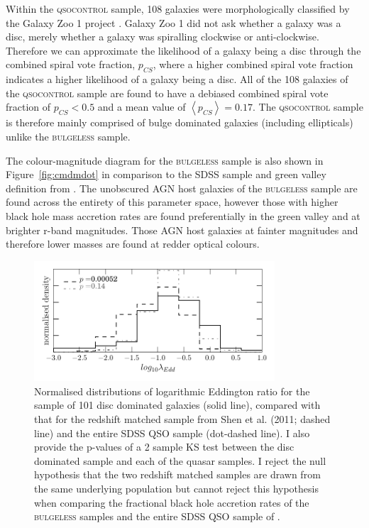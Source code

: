{Within the \textsc{qsocontrol} sample, 108 galaxies were morphologically classified by the Galaxy Zoo 1 project \cite{lintott08, Lintott11}. Galaxy Zoo 1 did not ask whether a galaxy was a disc, merely whether a galaxy was spiralling clockwise or anti-clockwise. Therefore we can approximate the likelihood of a galaxy being a disc through the combined spiral vote fraction, $p_{CS}$, where a higher combined spiral vote fraction indicates a higher likelihood of a galaxy being a disc. All of the 108 galaxies of the \textsc{qsocontrol} sample are found to have a debiased combined spiral vote fraction  of $p_{CS} < 0.5$ and a mean value of $\left<p_{CS} \right> = 0.17$.  The \textsc{qsocontrol} sample is therefore mainly comprised of bulge dominated galaxies (including ellipticals) unlike the \textsc{bulgeless} sample. %

The colour-magnitude diagram for the \textsc{bulgeless} sample is also shown in Figure~\ref{fig:cmdmdot} in comparison to the SDSS sample and green valley definition from \citet{Baldry04}. The unobscured AGN host galaxies of the \textsc{bulgeless} sample are found across the entirety of this parameter space, however those with higher black hole mass accretion rates are found preferentially in the green valley and at brighter r-band magnitudes. Those AGN host galaxies at fainter magnitudes and therefore lower masses are found at redder optical colours.


\begin{figure}
\centering
\includegraphics[width=0.8\textwidth]{agn/edd_ratio_z_matched_shen_2011_compare.pdf}
\caption[Eddington ratio distribution of the \textsc{bulgeless} sample]{Normalised distributions of logarithmic Eddington ratio for the sample of 101 disc dominated galaxies (solid line), compared with that for the redshift matched sample from Shen et al. (2011; dashed line) and the entire SDSS QSO sample (dot-dashed line). I also provide the p-values of a 2 sample KS test between the disc dominated sample and each of the quasar samples. I reject the null hypothesis that the two redshift matched samples are drawn from the same underlying population but cannot reject this hypothesis when comparing the fractional black hole accretion rates of the \textsc{bulgeless} samples and the entire SDSS QSO sample of \citet{shen11}.  
}
\label{fig:eddratioshen}
\end{figure}


}
